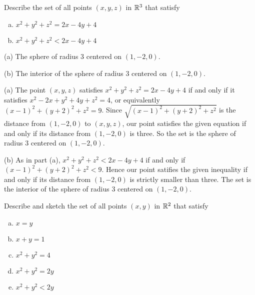 


\subsection*{\Conceptual}


\begin{question}
 Describe the set of all points $(x,y,z)$ 
in $\mathbb{R}^3$ that satisfy
\begin{enumerate}[(a)] 
\item
          $x^2 +y^2+z^2= 2x-4y+4$
\item
          $x^2 +y^2+z^2< 2x-4y+4$
\end{enumerate}
\end{question}

%

\begin{answer}
(a) The sphere of radius 3 centered on $(1,-2,0)$.

(b) The interior of the sphere of radius 3 centered on $(1,-2,0)$.

\end{answer}

\begin{solution}
(a) The point $(x,y,z)$ satisfies $x^2 +y^2+z^2= 2x-4y+4$
if and only if it satisfies $x^2-2x +y^2+4y+z^2= 4$, or equivalently 
$(x-1)^2 +(y+2)^2+z^2=9 $. Since $\sqrt{(x-1)^2 +(y+2)^2+z^2}$ is the distance
from $(1, -2, 0)$ to $(x,y,z)$, our point satisfies the given equation
if and only if its distance from $(1,-2,0)$ is three. So the set is
the sphere of radius 3 centered on $(1,-2,0)$.

(b)
As in part (a), $x^2 +y^2+z^2< 2x-4y+4$
if and only if  $(x-1)^2 +(y+2)^2+z^2<9 $. Hence our point 
satifies the given inequality
if and only if its distance from $(1,-2,0)$ is strictly smaller than three. 
The set is the interior of the sphere of radius 3 centered on $(1,-2,0)$.

\end{solution}

\begin{question}
Describe and sketch the set of all points $(x,y)$ 
in $\mathbb{R}^2$ that satisfy
\begin{enumerate}[(a)]
\item
$x=y$
\item
$x+y=1$
\item
$x^2+y^2=4$
\item
$x^2+y^2=2y$
\item
$x^2+y^2<2y$
\end{enumerate}
\end{question}

